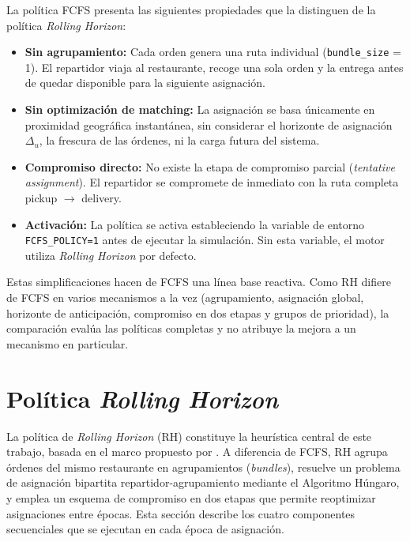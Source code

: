 \documentclass[12pt,letterpaper,oneside]{book}
\begin{document}
	La política FCFS presenta las siguientes propiedades que la distinguen de la política
	\textit{Rolling Horizon}:

	\begin{itemize}
		\item \textbf{Sin agrupamiento:} Cada orden genera una ruta individual 
		(\texttt{bundle\_size} = 1). El repartidor viaja al restaurante, recoge una sola orden 
		y la entrega antes de quedar disponible para la siguiente asignación.

		\item \textbf{Sin optimización de matching:} La asignación se basa únicamente en 
		proximidad geográfica instantánea, sin considerar el horizonte de asignación 
		$\Delta_u$, la frescura de las órdenes, ni la carga futura del sistema.

		\item \textbf{Compromiso directo:} No existe la etapa de compromiso parcial 
		(\textit{tentative assignment}). El repartidor se compromete de inmediato con la ruta 
		completa pickup $\to$ delivery.

		\item \textbf{Activación:} La política se activa estableciendo la variable de entorno
		\texttt{FCFS\_POLICY=1} antes de ejecutar la simulación. Sin esta variable, el motor
		utiliza \textit{Rolling Horizon} por defecto.
	\end{itemize}

	Estas simplificaciones hacen de FCFS una línea base reactiva.  Como RH difiere de FCFS en
	varios mecanismos a la vez (agrupamiento, asignación global, horizonte de anticipación,
	compromiso en dos etapas y grupos de prioridad), la comparación evalúa las políticas
	completas y no atribuye la mejora a un mecanismo en particular.

	\section{Política \textit{Rolling Horizon}}

	La política de \textit{Rolling Horizon} (RH) constituye la heurística central de este
	trabajo, basada en el marco propuesto por \citet{Reyes2018}. A diferencia de FCFS, RH
	agrupa órdenes del mismo restaurante en agrupamientos (\textit{bundles}), resuelve un
	problema de asignación bipartita repartidor-agrupamiento mediante el Algoritmo Húngaro, y 
	emplea un esquema de compromiso en dos etapas que permite reoptimizar asignaciones entre 
	épocas. Esta sección describe los cuatro componentes secuenciales que se ejecutan en cada 
	época de asignación.
\end{document}
